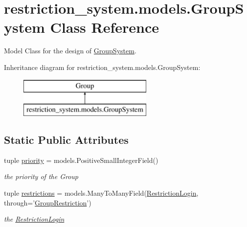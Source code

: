 \hypertarget{classrestriction__system_1_1models_1_1GroupSystem}{}\section{restriction\+\_\+system.\+models.\+Group\+System Class Reference}
\label{classrestriction__system_1_1models_1_1GroupSystem}


Model Class for the design of \hyperlink{classrestriction__system_1_1models_1_1GroupSystem}{Group\+System}.  


Inheritance diagram for restriction\+\_\+system.\+models.\+Group\+System\+:\begin{figure}[H]
\begin{center}
\leavevmode
\includegraphics[height=2.000000cm]{classrestriction__system_1_1models_1_1GroupSystem}
\end{center}
\end{figure}
\subsection*{Static Public Attributes}
\begin{DoxyCompactItemize}
\item 
\hypertarget{classrestriction__system_1_1models_1_1GroupSystem_ab73195b2ce16253e0afd843193c428ea}{}tuple \hyperlink{classrestriction__system_1_1models_1_1GroupSystem_ab73195b2ce16253e0afd843193c428ea}{priority} = models.\+Positive\+Small\+Integer\+Field()\label{classrestriction__system_1_1models_1_1GroupSystem_ab73195b2ce16253e0afd843193c428ea}

\begin{DoxyCompactList}\small\item\em the priority of the Group \end{DoxyCompactList}\item 
\hypertarget{classrestriction__system_1_1models_1_1GroupSystem_a492a768a20031a9cf7aab9db2ff717bf}{}tuple \hyperlink{classrestriction__system_1_1models_1_1GroupSystem_a492a768a20031a9cf7aab9db2ff717bf}{restrictions} = models.\+Many\+To\+Many\+Field(\hyperlink{classrestriction__system_1_1models_1_1RestrictionLogin}{Restriction\+Login}, through='\hyperlink{classrestriction__system_1_1models_1_1GroupRestriction}{Group\+Restriction}')\label{classrestriction__system_1_1models_1_1GroupSystem_a492a768a20031a9cf7aab9db2ff717bf}

\begin{DoxyCompactList}\small\item\em the \hyperlink{classrestriction__system_1_1models_1_1RestrictionLogin}{Restriction\+Login} \end{DoxyCompactList}\end{DoxyCompactItemize}


